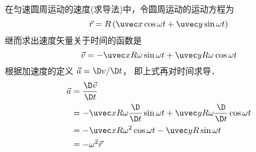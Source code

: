 
在匀速圆周运动的速度(求导法)中，令圆周运动的运动方程为
\begin{equation}
\vec r = R\left( {\uvec x\cos \omega t + \uvec y\sin\omega t} \right)
\end{equation}
继而求出速度矢量关于时间的函数是
\begin{equation}
\vec v =  - \uvec xR\omega \sin \omega t + \uvec yR\omega \cos \omega t
\end{equation} 
根据加速度的定义 $\vec a = \D v/\D t$， 即上式再对时间求导．
\begin{equation}\begin{split}
\vec a &= \frac{\D\vec v}{\D t} \\
&=  - \uvec x R\omega \frac{\D}{\D t} \sin \omega t + \uvec yR\omega \frac{\D}{\D t}\cos \omega t\\
&=  - \uvec xR{\omega ^2}\cos \omega t - \uvec yR \sin \omega t\\
&=  - {\omega ^2}\vec r
\end{split}\end{equation} 









